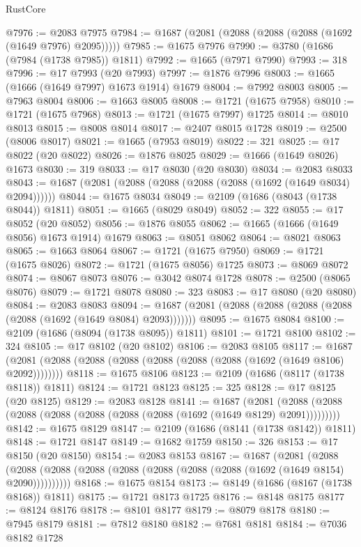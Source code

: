 \begin{lexlean}{RustCore}
\begin{coremodule}
@7976 := @2083 @7975
@7984 := @1687 (@2081 (@2088 (@2088 (@2088 (@1692 (@1649 @7976) @2095)))))
@7985 := @1675 @7976
@7990 := @3780 (@1686 (@7984 (@1738 @7985)) @1811)
@7992 := @1665 (@7971 @7990)
@7993 := 318
@7996 := @17 @7993 (@20 @7993)
@7997 := @1876 @7996
@8003 := @1665 (@1666 (@1649 @7997) @1673 @1914) @1679
@8004 := @7992 @8003
@8005 := @7963 @8004
@8006 := @1663 @8005
@8008 := @1721 (@1675 @7958)
@8010 := @1721 (@1675 @7968)
@8013 := @1721 (@1675 @7997) @1725
@8014 := @8010 @8013
@8015 := @8008 @8014
@8017 := @2407 @8015 @1728
@8019 := @2500 (@8006 @8017)
@8021 := @1665 (@7953 @8019)
@8022 := 321
@8025 := @17 @8022 (@20 @8022)
@8026 := @1876 @8025
@8029 := @1666 (@1649 @8026) @1673
@8030 := 319
@8033 := @17 @8030 (@20 @8030)
@8034 := @2083 @8033
@8043 := @1687 (@2081 (@2088 (@2088 (@2088 (@2088 (@1692 (@1649 @8034) @2094))))))
@8044 := @1675 @8034
@8049 := @2109 (@1686 (@8043 (@1738 @8044)) @1811)
@8051 := @1665 (@8029 @8049)
@8052 := 322
@8055 := @17 @8052 (@20 @8052)
@8056 := @1876 @8055
@8062 := @1665 (@1666 (@1649 @8056) @1673 @1914) @1679
@8063 := @8051 @8062
@8064 := @8021 @8063
@8065 := @1663 @8064
@8067 := @1721 (@1675 @7950)
@8069 := @1721 (@1675 @8026)
@8072 := @1721 (@1675 @8056) @1725
@8073 := @8069 @8072
@8074 := @8067 @8073
@8076 := @3042 @8074 @1728
@8078 := @2500 (@8065 @8076)
@8079 := @1721 @8078
@8080 := 323
@8083 := @17 @8080 (@20 @8080)
@8084 := @2083 @8083
@8094 := @1687 (@2081 (@2088 (@2088 (@2088 (@2088 (@2088 (@1692 (@1649 @8084) @2093)))))))
@8095 := @1675 @8084
@8100 := @2109 (@1686 (@8094 (@1738 @8095)) @1811)
@8101 := @1721 @8100
@8102 := 324
@8105 := @17 @8102 (@20 @8102)
@8106 := @2083 @8105
@8117 := @1687 (@2081 (@2088 (@2088 (@2088 (@2088 (@2088 (@2088 (@1692 (@1649 @8106) @2092))))))))
@8118 := @1675 @8106
@8123 := @2109 (@1686 (@8117 (@1738 @8118)) @1811)
@8124 := @1721 @8123
@8125 := 325
@8128 := @17 @8125 (@20 @8125)
@8129 := @2083 @8128
@8141 := @1687
    (@2081 (@2088 (@2088 (@2088 (@2088 (@2088 (@2088 (@2088 (@1692 (@1649 @8129) @2091)))))))))
@8142 := @1675 @8129
@8147 := @2109 (@1686 (@8141 (@1738 @8142)) @1811)
@8148 := @1721 @8147
@8149 := @1682 @1759
@8150 := 326
@8153 := @17 @8150 (@20 @8150)
@8154 := @2083 @8153
@8167 := @1687
    (@2081
      (@2088 (@2088 (@2088 (@2088 (@2088 (@2088 (@2088 (@2088 (@1692 (@1649 @8154) @2090))))))))))
@8168 := @1675 @8154
@8173 := @8149 (@1686 (@8167 (@1738 @8168)) @1811)
@8175 := @1721 @8173 @1725
@8176 := @8148 @8175
@8177 := @8124 @8176
@8178 := @8101 @8177
@8179 := @8079 @8178
@8180 := @7945 @8179
@8181 := @7812 @8180
@8182 := @7681 @8181
@8184 := @7036 @8182 @1728

\end{coremodule}
\end{lexlean}
